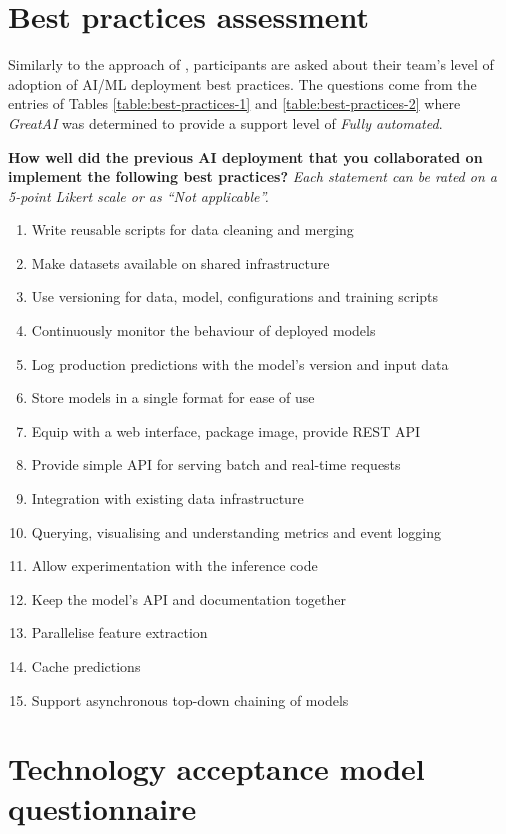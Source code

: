 \appendix

\chapter{Best practices assessment} \label{appendix:practices}

Similarly to the approach of \cite{serban2020adoption}, participants are asked about their team's level of adoption of AI/ML deployment best practices. The questions come from the entries of Tables \ref{table:best-practices-1} and \ref{table:best-practices-2} where \textit{GreatAI} was determined to provide a support level of \textit{Fully automated}.

\textbf{How well did the previous AI deployment that you collaborated on implement the following best practices?} \textit{Each statement can be rated on a 5-point Likert scale or as ``Not applicable''.}

\begin{enumerate}
\item Write reusable scripts for data cleaning and merging
\item Make datasets available on shared infrastructure
\item Use versioning for data, model, configurations and training scripts
\item Continuously monitor the behaviour of deployed models
\item Log production predictions with the model's version and input data
\item Store models in a single format for ease of use
\item Equip with a web interface, package image, provide REST API
\item Provide simple API for serving batch and real-time requests
\item Integration with existing data infrastructure
\item Querying, visualising and understanding metrics and event logging
\item Allow experimentation with the inference code
\item Keep the model's API and documentation together
\item Parallelise feature extraction
\item Cache predictions
\item Support asynchronous top-down chaining of models
\end{enumerate}

\chapter{Technology acceptance model questionnaire} \label{appendix:questions}

